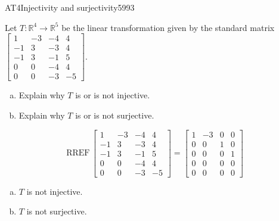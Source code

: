 \begin{exercise}{AT4}{Injectivity and surjectivity}{5993} 
\begin{exerciseStatement} 

 Let \(T:\mathbb{R}^4 \to \mathbb{R}^5\) be the linear transformation given by the standard matrix \(\left[\begin{array}{cccc}
1 & -3 & -4 & 4 \\
-1 & 3 & -3 & 4 \\
-1 & 3 & -1 & 5 \\
0 & 0 & -4 & 4 \\
0 & 0 & -3 & -5
\end{array}\right]\). 

 

\begin{enumerate}[(a)]
\item 

Explain why \(T\) is or is not injective.


\item 

Explain why \(T\) is or is not surjective.


\end{enumerate}

     \end{exerciseStatement}
 \begin{exerciseAnswer} 

\[\mathrm{RREF}\,\left[\begin{array}{cccc}
1 & -3 & -4 & 4 \\
-1 & 3 & -3 & 4 \\
-1 & 3 & -1 & 5 \\
0 & 0 & -4 & 4 \\
0 & 0 & -3 & -5
\end{array}\right]=\left[\begin{array}{cccc}
1 & -3 & 0 & 0 \\
0 & 0 & 1 & 0 \\
0 & 0 & 0 & 1 \\
0 & 0 & 0 & 0 \\
0 & 0 & 0 & 0
\end{array}\right]\]

 

\begin{enumerate}[(a)]
\item  

\(T\) is not injective.

 
\item  

\(T\) is not surjective.

 
\end{enumerate}

     \end{exerciseAnswer}
 \end{exercise}


